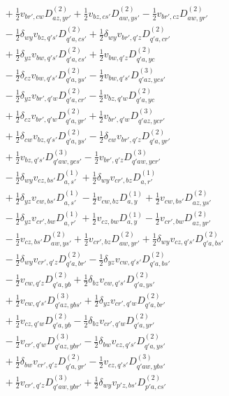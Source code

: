 \begin{align*}
&\quad +\tfrac12v_{br',cw}D^{(2)}_{az,yr'}+\tfrac12v_{bz,cs'}D^{(2)}_{aw,ys'}-\tfrac12v_{br',cz}D^{(2)}_{aw,yr'} \\
&\quad -\tfrac12\delta_{wy}v_{bz,q's'}D^{(2)}_{q'a,cs'}+\tfrac12\delta_{wy}v_{br',q'z}D^{(2)}_{q'a,cr'} \\
&\quad +\tfrac12\delta_{yz}v_{bw,q's'}D^{(2)}_{q'a,cs'}+\tfrac12v_{bw,q'z}D^{(2)}_{q'a,yc} \\
&\quad -\tfrac12\delta_{cz}v_{bw,q's'}D^{(2)}_{q'a,ys'}-\tfrac12v_{bw,q's'}D^{(3)}_{q'az,ycs'} \\
&\quad -\tfrac12\delta_{yz}v_{br',q'w}D^{(2)}_{q'a,cr'}-\tfrac12v_{bz,q'w}D^{(2)}_{q'a,yc} \\
&\quad +\tfrac12\delta_{cz}v_{br',q'w}D^{(2)}_{q'a,yr'}+\tfrac12v_{br',q'w}D^{(3)}_{q'az,ycr'} \\
&\quad +\tfrac12\delta_{cw}v_{bz,q's'}D^{(2)}_{q'a,ys'}-\tfrac12\delta_{cw}v_{br',q'z}D^{(2)}_{q'a,yr'} \\
&\quad +\tfrac12v_{bz,q's'}D^{(3)}_{q'aw,ycs'}-\tfrac12v_{br',q'z}D^{(3)}_{q'aw,ycr'} \\
&\quad -\tfrac12\delta_{wy}v_{cz,bs'}D^{(1)}_{a,s'}+\tfrac12\delta_{wy}v_{cr',bz}D^{(1)}_{a,r'} \\
&\quad +\tfrac12\delta_{yz}v_{cw,bs'}D^{(1)}_{a,s'}-\tfrac12v_{cw,bz}D^{(1)}_{a,y}+\tfrac12v_{cw,bs'}D^{(2)}_{az,ys'} \\
&\quad -\tfrac12\delta_{yz}v_{cr',bw}D^{(1)}_{a,r'}+\tfrac12v_{cz,bw}D^{(1)}_{a,y}-\tfrac12v_{cr',bw}D^{(2)}_{az,yr'} \\
&\quad -\tfrac12v_{cz,bs'}D^{(2)}_{aw,ys'}+\tfrac12v_{cr',bz}D^{(2)}_{aw,yr'}+\tfrac12\delta_{wy}v_{cz,q's'}D^{(2)}_{q'a,bs'} \\
&\quad -\tfrac12\delta_{wy}v_{cr',q'z}D^{(2)}_{q'a,br'}-\tfrac12\delta_{yz}v_{cw,q's'}D^{(2)}_{q'a,bs'} \\
&\quad -\tfrac12v_{cw,q'z}D^{(2)}_{q'a,yb}+\tfrac12\delta_{bz}v_{cw,q's'}D^{(2)}_{q'a,ys'} \\
&\quad +\tfrac12v_{cw,q's'}D^{(3)}_{q'az,ybs'}+\tfrac12\delta_{yz}v_{cr',q'w}D^{(2)}_{q'a,br'} \\
&\quad +\tfrac12v_{cz,q'w}D^{(2)}_{q'a,yb}-\tfrac12\delta_{bz}v_{cr',q'w}D^{(2)}_{q'a,yr'} \\
&\quad -\tfrac12v_{cr',q'w}D^{(3)}_{q'az,ybr'}-\tfrac12\delta_{bw}v_{cz,q's'}D^{(2)}_{q'a,ys'} \\
&\quad +\tfrac12\delta_{bw}v_{cr',q'z}D^{(2)}_{q'a,yr'}-\tfrac12v_{cz,q's'}D^{(3)}_{q'aw,ybs'} \\
&\quad +\tfrac12v_{cr',q'z}D^{(3)}_{q'aw,ybr'}+\tfrac12\delta_{wy}v_{p'z,bs'}D^{(2)}_{p'a,cs'} \\

\end{align*}
